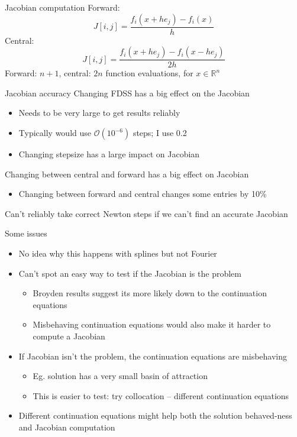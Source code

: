 \documentclass[presentation]{beamer}
\begin{document}
\begin{frame}[label={sec:org01679d2}]{Jacobian computation}
Forward:
\[J[i,j] = \frac{f_i(x + h e_j) - f_i(x)}{h}\]
Central:
\[J[i,j] = \frac{f_i(x + h e_j) - f_i(x - h e_j)}{2h}\]
\vfill
Forward: \(n+1\), central: \(2n\) function evaluations, for \(x\in\mathbb{R}^n\)
\end{frame}

\begin{frame}[label={sec:org82418a8}]{Jacobian accuracy}
Changing FDSS has a big effect on the Jacobian
\begin{itemize}
\item Needs to be very large to get results reliably
\item Typically would use \(\mathcal{O}(10^{-6})\) steps; I use 0.2
\item Changing stepsize has a large impact on Jacobian
\end{itemize}
\vfill
Changing between central and forward has a big effect on Jacobian
\begin{itemize}
\item Changing between forward and central changes some entries by 10\%
\end{itemize}
\vfill
Can't reliably take correct Newton steps if we can't find an accurate Jacobian
\end{frame}

\begin{frame}[label={sec:org92e344d}]{Some issues}
\begin{itemize}
\item No idea why this happens with splines but not Fourier
\end{itemize}
\vfill
\begin{itemize}
\item Can't spot an easy way to test if the Jacobian is the problem
\begin{itemize}
\item Broyden results suggest its more likely down to the continuation equations
\item Misbehaving continuation equations would also make it harder to compute a Jacobian
\end{itemize}
\end{itemize}
\vfill
\begin{itemize}
\item If Jacobian isn't the problem, the continuation equations are misbehaving
\begin{itemize}
\item Eg. solution has a very small basin of attraction
\item This is easier to test: try collocation -- different continuation equations
\end{itemize}
\end{itemize}
\vfill
\begin{itemize}
\item Different continuation equations might help both the solution behaved-ness and Jacobian computation
\end{itemize}
\end{frame}
\end{document}
